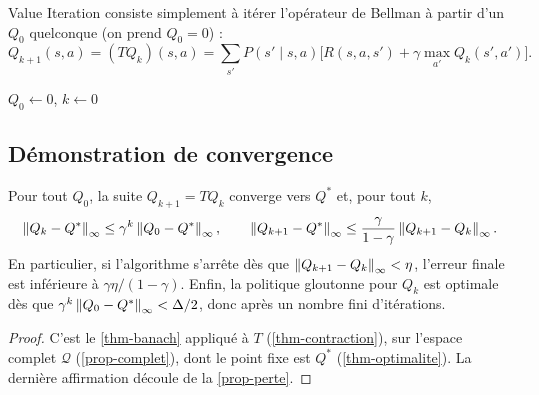 Value Iteration consiste simplement à itérer l'opérateur de Bellman à partir d'un $Q_0$ quelconque (on prend $Q_0=0$) :
\[
Q_{k+1}(s,a)=(TQ_k)(s,a)=\sum_{s'}P(s'\mid s,a)\Big[R(s,a,s')+\gamma\max_{a'}Q_k(s',a')\Big].
\]

\begin{algorithm}[ht]
\caption{Value Iteration (fonction \texttt{value\_iteration})}
\KwIn{$P$, $R$, $\gamma\in[0,1)$, tolérance $\eta>0$}
$Q_0\leftarrow0$, $k\leftarrow0$\;
\end{algorithm}

\subsection{Démonstration de convergence}

\begin{theoreme}\label{thm-vi}
Pour tout $Q_0$, la suite $Q_{k+1}=TQ_k$ converge vers $Q^*$ et, pour tout $k$,
\[
\left\lVert Q_k-Q^* \right\rVert_\infty\le\gamma^k\left\lVert Q_0-Q^* \right\rVert_\infty,\qquad
\left\lVert Q_{k+1}-Q^* \right\rVert_\infty\le\frac{\gamma}{1-\gamma}\left\lVert Q_{k+1}-Q_k \right\rVert_\infty.
\]
En particulier, si l'algorithme s'arrête dès que $\left\lVert Q_{k+1}-Q_k \right\rVert_\infty<\eta$, l'erreur finale est inférieure à $\gamma\eta/(1-\gamma)$. Enfin, la politique gloutonne pour $Q_k$ est optimale dès que $\gamma^k\left\lVert Q_0-Q^* \right\rVert_\infty<\Delta/2$, donc après un nombre fini d'itérations.
\end{theoreme}
\begin{proof}
C'est le \cref{thm-banach} appliqué à $T$ (\cref{thm-contraction}), sur l'espace complet $\mathcal Q$ (\cref{prop-complet}), dont le point fixe est $Q^*$ (\cref{thm-optimalite}). La dernière affirmation découle de la \cref{prop-perte}.
\end{proof}

